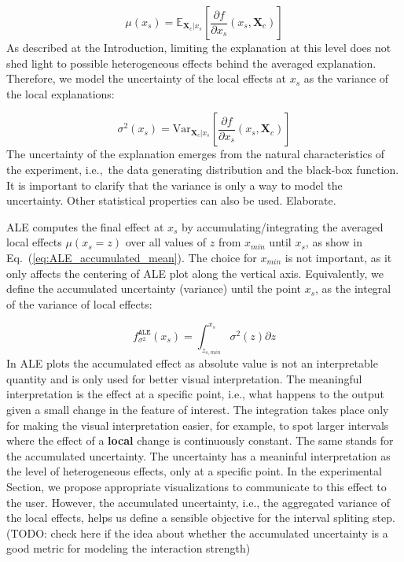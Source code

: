 \documentclass[twoside]{article}
\newcommand{\dfdx}{\frac{\partial f}{\partial x_s}}
\newcommand{\Xcb}{\mathbf{X}_c}
\begin{document}
\begin{equation}
  \label{eq:ALE_mean}
  \mu(x_s) = \mathbb{E}_{\Xcb|x_s}\left [\dfdx (x_s, \Xcb)\right ]
\end{equation}
\noindent
As described at the Introduction, limiting the explanation at this
level does not shed light to possible heterogeneous effects behind the
averaged explanation. Therefore, we model the uncertainty of the local
effects at \(x_s\) as the variance of the local explanations:

\begin{equation}
  \label{eq:ALE_var}
  \sigma^2(x_s) = \mathrm{Var}_{\Xcb|x_s}\left [\dfdx (x_s, \Xcb) \right ]
\end{equation}
\noindent
The uncertainty of the explanation emerges from the natural
characteristics of the experiment, i.e.,~the data generating
distribution and the black-box function. It is important to clarify
that the variance is only a way to model the uncertainty. Other
statistical properties can also be used. Elaborate.

ALE computes the final effect at \(x_s\) by accumulating/integrating
the averaged local effects \(\mu (x_s=z) \) over all values of \(z\)
from \(x_{min}\) until \(x_s\), as show in Eq.~(\ref{eq:ALE_accumulated_mean}). The
choice for \(x_{min}\) is not important, as it only affects the
centering of ALE plot along the vertical axis. Equivalently, we define
the accumulated uncertainty (variance) until the point \(x_s\), as the
integral of the variance of local effects:

\begin{equation}
  \label{eq:ALE_accumulated_var}
  f^{\mathtt{ALE}}_{\sigma^2}(x_s) = \int_{z_{s, min}}^{x_s} \sigma^2(z) \partial z
\end{equation}
\noindent
In ALE plots the accumulated effect as absolute value is not an
interpretable quantity and is only used for better visual
interpretation\citep{Gromping2020MAEP}. The meaningful interpretation
is the effect at a specific point, i.e., what happens to the output
given a small change in the feature of interest. The integration takes
place only for making the visual interpretation easier, for example,
to spot larger intervals where the effect of a \textbf{local} change
is continuously constant. The same stands for the accumulated
uncertainty. The uncertainty has a meaninful interpretation as the
level of heterogeneous effects, only at a specific point. In the
experimental Section, we propose appropriate visualizations to
communicate to this effect to the user. However, the accumulated
uncertainty, i.e., the aggregated variance of the local effects, helps
us define a sensible objective for the interval spliting step. (TODO:
check here if the idea about whether the accumulated uncertainty is a
good metric for modeling the interaction strength)
\end{document}
